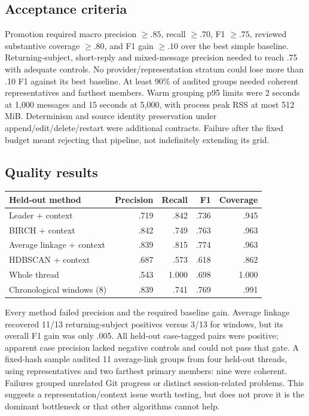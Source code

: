 \documentclass[11pt]{article}
\begin{document}
\subsection{Acceptance criteria}
Promotion required macro precision $\geq .85$, recall $\geq .70$, F1 $\geq .75$,
reviewed substantive coverage $\geq .80$, and F1 gain $\geq .10$ over the best
simple baseline. Returning-subject, short-reply and mixed-message precision
needed to reach .75 with adequate controls. No provider/representation stratum
could lose more than .10 F1 against its best baseline. At least 90\% of audited
groups needed coherent representatives and farthest members. Warm grouping
p95 limits were 2 seconds at 1,000 messages and 15 seconds at 5,000, with process
peak RSS at most 512 MiB. Determinism and source identity preservation under
append/edit/delete/restart were additional contracts. Failure after the fixed
budget meant rejecting that pipeline, not indefinitely extending its grid.

\subsection{Quality results}
\begin{center}
\begin{tabular}{lrrrr}
\toprule
Held-out method & Precision & Recall & F1 & Coverage\\
\midrule
Leader + context & .719 & .842 & .736 & .945\\
BIRCH + context & .842 & .749 & .763 & .963\\
Average linkage + context & .839 & .815 & .774 & .963\\
HDBSCAN + context & .687 & .573 & .618 & .862\\
Whole thread & .543 & 1.000 & .698 & 1.000\\
Chronological windows (8) & .839 & .741 & .769 & .991\\
\bottomrule
\end{tabular}
\end{center}
Every method failed precision and the required baseline gain. Average linkage
recovered 11/13 returning-subject positives versus 3/13 for windows, but its
overall F1 gain was only .005. All held-out case-tagged pairs were positive;
apparent case precision lacked negative controls and could not pass that gate.
A fixed-hash sample audited 11 average-link groups from four held-out threads,
using representatives and two farthest primary members: nine were coherent.
Failures grouped unrelated Git progress or distinct session-related problems.
This suggests a representation/context issue worth testing, but does not prove
it is the dominant bottleneck or that other algorithms cannot help.
\end{document}
